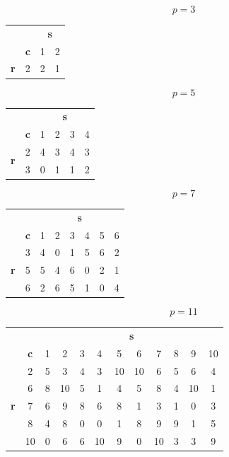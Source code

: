 \documentclass{article}
\begin{document}
\begin{center}
	
\[p = 3\]
\begin{tabular}{cc|c|c|}
	&              & \multicolumn{2}{c|}{\textbf{s}} \\
	& \textbf{c}   & 1& 2 \\ \hline
	\textbf{r} & 2 & 2& 1 \\ \hline
\end{tabular}
\bigskip

\[p = 5\]
\begin{tabular}{cc|c|c|c|c|}
	&                               & \multicolumn{4}{c|}{\textbf{s}} \\
	& \textbf{c}                    & 1& 2& 3& 4 \\ \hline
	\multirow{2}{*}{\textbf{r}} & 2 & 4& 3& 4& 3 \\ \cline{2-6}
	                            & 3 & 0& 1& 1& 2 \\ \hline
\end{tabular}
\bigskip

\[p = 7\]
\begin{tabular}{cc|c|c|c|c|c|c|}
	&                               & \multicolumn{6}{c|}{\textbf{s}} \\
	& \textbf{c}                    & 1& 2& 3& 4& 5& 6 \\ \hline
	\multirow{3}{*}{\textbf{r}} & 3 & 4& 0& 1& 5& 6& 2 \\ \cline{2-8}
	                            & 5 & 5& 4& 6& 0& 2& 1 \\ \cline{2-8}
	                            & 6 & 2& 6& 5& 1& 0& 4 \\ \hline
\end{tabular}
\bigskip

\[p = 11\]
\begin{tabular}{cc|c|c|c|c|c|c|c|c|c|c|}
	&                               & \multicolumn{10}{c|}{\textbf{s}} \\
	& \textbf{c}                    & 1& 2& 3& 4& 5& 6& 7& 8& 9&10 \\ \hline
	\multirow{5}{*}{\textbf{r}} & 2 & 5& 3& 4& 3&10&10& 6& 5& 6& 4 \\ \cline{2-12}
								& 6 & 8&10& 5& 1& 4& 5& 8& 4&10& 1 \\ \cline{2-12}
								& 7 & 6& 9& 8& 6& 8& 1& 3& 1& 0& 3 \\ \cline{2-12}
								& 8 & 4& 8& 0& 0& 1& 8& 9& 9& 1& 5 \\ \cline{2-12}
								&10 & 0& 6& 6&10& 9& 0&10& 3& 3& 9 \\ \hline
\end{tabular}
\bigskip


\end{center}
\end{document}

